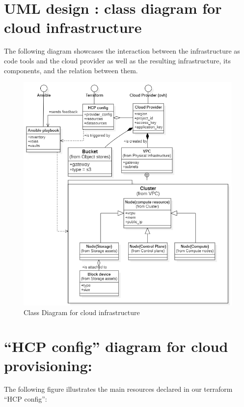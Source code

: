 \section{UML design : class diagram for cloud infrastructure }
The following diagram showcases the interaction between the infrastructure as code tools and the cloud provider as well as the resulting infrastructure, its components, and the relation between them. 
\begin{figure}[H]\centering
\includegraphics[width=1.0\textwidth,angle=00]{assets/f13.png}
\caption{Class Diagram for cloud infrastructure}
\label{fig:fig13}
\end{figure}

\section{“HCP config” diagram for cloud provisioning: }
The following figure illustrates the main resources declared in our terraform “HCP config”: 

